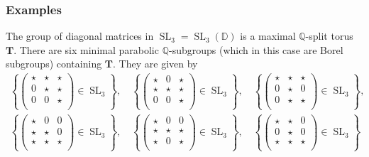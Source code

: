 \documentclass[12pt]{amsart}
\newcommand{\Q}{\mathbb{Q} }
\newcommand{\D}{\mathbb{D} }
\newcommand{\bT}{\mathbf{T}}
\numberwithin{equation}{section}
\theoremstyle{remark} %
\begin{document}
\subsubsection{Examples}
The group of diagonal matrices in $\operatorname{SL}_3=\operatorname{SL}_3(\D)$ is a maximal $\Q$-split torus $\bT$. There are six minimal parabolic $\Q$-subgroups (which in this case are Borel subgroups) containing $\bT$. They are given by
\begin{align*}
	\left\{ \begin{pmatrix}
		\star & \star & \star  \\
		0 & \star & \star  \\
		0 & 0 & \star  \\
	\end{pmatrix} \in \operatorname{SL}_3 \right\} , \quad \left\{ \begin{pmatrix}
	\star & 0 & \star  \\
	\star & \star & \star  \\
	0 & 0 & \star  \\
\end{pmatrix} \in \operatorname{SL}_3 \right\} , \quad\left\{ \begin{pmatrix}
\star & \star & \star  \\
0 & \star & 0  \\
0 & \star & \star  \\
\end{pmatrix} \in \operatorname{SL}_3 \right\} , \\
\left\{ \begin{pmatrix}
	\star & 0 & 0  \\
	\star & \star & 0  \\
	\star & \star & \star  \\
\end{pmatrix} \in \operatorname{SL}_3 \right\} , \quad \left\{ \begin{pmatrix}
	\star & 0 & 0  \\
	\star & \star & \star  \\
	\star & 0 & \star  \\
\end{pmatrix} \in \operatorname{SL}_3 \right\} , \quad\left\{ \begin{pmatrix}
	\star & \star & 0  \\
	0 & \star & 0  \\
	\star & \star & \star  \\
\end{pmatrix} \in \operatorname{SL}_3 \right\} 
\end{align*}
\end{document}
